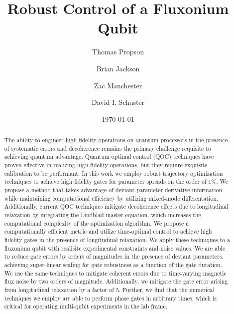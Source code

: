 \documentclass[
  amsfonts,
  amsmath,
  tbtags,
  amssymb,
  aps,
  nobibnotes,
  twocolumn,
  superscriptaddress,
]{revtex4-2}
\begin{document}
\title{Robust Control of a Fluxonium Qubit}

\author{Thomas Propson}
\author{Brian Jackson}
\author{Zac Manchester}
\author{David I. Schuster}

\date{\today}


\begin{abstract}
  The ability to engineer high fidelity operations on quantum processors in the presence of
  systematic errors and decoherence remains the primary challenge requisite to achieving quantum advantage.
  Quantum optimal control (QOC) techniques have proven effective in realizing high fidelity operations,
  but they require exquisite calibration to be performant.
  In this work we employ robust trajectory optimization techniques
  to achieve high fidelity gates for parameter spreads on the order of $1\%$.
  We propose a method that takes advantage of deviant parameter derivative information while maintaining
  computational efficiency by utilizing mixed-mode differentation.
  Additionally, current QOC techniques mitigate decoherence effects due to longitudinal relaxation by integrating
  the Lindblad master equation, which increases the computational complexity
  of the optimization algorithm. We propose a computationally efficient metric
  and utilize time-optimal control to achieve high fidelity gates in the presence of longitudinal relaxation.
  We apply these techniques to a fluxonium qubit with realisitc experimental constraints
  and noise values. We are able to reduce gate errors by orders of magnitudes in the presence
  of deviant parameters, achieving super-linear scaling for gate robustness as a function of the gate duration.
  We use the same techniques to mitigate coherent errors due to time-varying magnetic flux noise
  by two orders of magnitude. Additionally, we mitigate the gate error arising from longitudinal
  relaxation by a factor of $5$. Further, we find that the numerical techniques we employ
  are able to perform phase gates in arbitrary times, which is critical for operating multi-qubit
  experiments in the lab frame.
\end{abstract}
\end{document}
